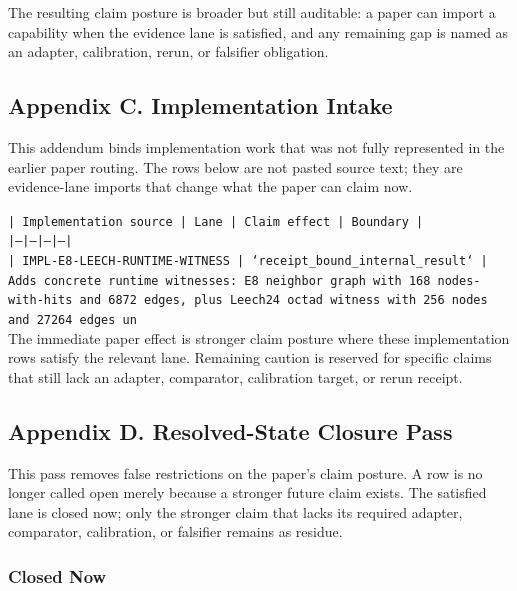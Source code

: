\documentclass[11pt]{article}
\begin{document}
The resulting claim posture is broader but still auditable: a paper can import a capability when the evidence lane is satisfied, and any remaining gap is named as an adapter, calibration, rerun, or falsifier obligation.

\subsection*{Appendix C. Implementation Intake}

This addendum binds implementation work that was not fully represented in the earlier paper routing. The rows below are not pasted source text; they are evidence-lane imports that change what the paper can claim now.

\noindent\texttt{| Implementation source | Lane | Claim effect | Boundary |}\\
\noindent\texttt{|---|---|---|---|}\\
\noindent\texttt{| IMPL-E8-LEECH-RUNTIME-WITNESS | `receipt\_bound\_internal\_result` | Adds concrete runtime witnesses: E8 neighbor graph with 168 nodes-with-hits and 6872 edges, plus Leech24 octad witness with 256 nodes and 27264 edges un}\\

The immediate paper effect is stronger claim posture where these implementation rows satisfy the relevant lane. Remaining caution is reserved for specific claims that still lack an adapter, comparator, calibration target, or rerun receipt.

\subsection*{Appendix D. Resolved-State Closure Pass}

This pass removes false restrictions on the paper's claim posture. A row is no longer called open merely because a stronger future claim exists. The satisfied lane is closed now; only the stronger claim that lacks its required adapter, comparator, calibration, or falsifier remains as residue.

\subsubsection*{Closed Now}
\end{document}
